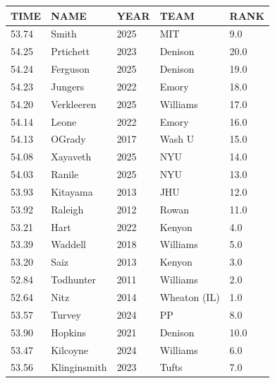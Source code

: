 \begin{table}[H]
\begin{minipage}[t]{0.48\textwidth}
\begin{tabular}{@{}p{1.8cm}p{2.8cm}p{1.2cm}p{1.4cm}p{0.8cm}@{}}
\hline
    \textbf{TIME} & \textbf{NAME} & \textbf{YEAR} & \textbf{TEAM} & \textbf{RANK} \\
\hline
    53.74 & Smith & 2025 & MIT & 9.0 \\
    54.25 & Prtichett & 2023 & Denison & 20.0 \\
    54.24 & Ferguson & 2025 & Denison & 19.0 \\
    54.23 & Jungers & 2022 & Emory & 18.0 \\
    54.20 & Verkleeren & 2025 & Williams & 17.0 \\
    54.14 & Leone & 2022 & Emory & 16.0 \\
    54.13 & OGrady & 2017 & Wash U & 15.0 \\
    54.08 & Xayaveth & 2025 & NYU & 14.0 \\
    54.03 & Ranile & 2025 & NYU & 13.0 \\
    53.93 & Kitayama & 2013 & JHU & 12.0 \\
    53.92 & Raleigh & 2012 & Rowan & 11.0 \\
    53.21 & Hart & 2022 & Kenyon & 4.0 \\
    53.39 & Waddell & 2018 & Williams & 5.0 \\
    53.20 & Saiz & 2013 & Kenyon & 3.0 \\
    52.84 & Todhunter & 2011 & Williams & 2.0 \\
    52.64 & Nitz & 2014 & Wheaton (IL) & 1.0 \\
    53.57 & Turvey & 2024 & PP & 8.0 \\
    53.90 & Hopkins & 2021 & Denison & 10.0 \\
    53.47 & Kilcoyne & 2024 & Williams & 6.0 \\
    53.56 & Klinginsmith & 2023 & Tufts & 7.0 \\
\hline
\end{tabular}
\end{minipage}
\end{table}

